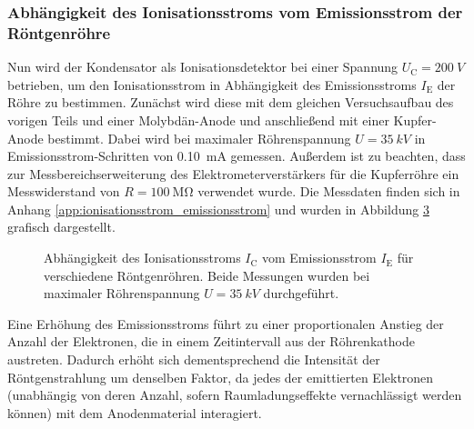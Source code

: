 \documentclass[11pt, a4paper]{article}
\numberwithin{equation}{section}
\begin{document}
\subsubsection{Abhängigkeit des Ionisationsstroms vom Emissionsstrom der Röntgenröhre}
\label{sec:abh_emissionsstrom}
Nun wird der Kondensator als Ionisationsdetektor bei einer Spannung $U_\mathrm{C} = \SI{200}{V}$ betrieben, um den Ionisationsstrom in Abhängigkeit des Emissionsstroms $I_\mathrm{E}$ der Röhre zu bestimmen.
Zunächst wird diese mit dem gleichen Versuchsaufbau des vorigen Teils und einer Molybdän-Anode und anschließend mit einer Kupfer-Anode bestimmt.
Dabei wird bei maximaler Röhrenspannung $U = \SI{35}{kV}$ in Emissionsstrom-Schritten von \SI{0.10}{mA} gemessen.
Außerdem ist zu beachten, dass zur Messbereichserweiterung des Elektrometerverstärkers für die Kupferröhre ein Messwiderstand von $R=\SI{100}{\mega\ohm}$ verwendet wurde.
Die Messdaten finden sich in Anhang \ref{app:ionisationsstrom_emissionsstrom} und wurden in Abbildung \ref{fig:abh_emissionsstrom} grafisch dargestellt.
\begin{figure}[hp]
	\begin{subfigure}[b]{1\textwidth}
		\centering
		
		\label{fig:mo_emissionsstrom}
	\end{subfigure}
	
	\vspace{10mm}
	
	\begin{subfigure}[b]{1\textwidth}
		\centering
		
		\label{fig:cu_emissionsstrom}
	\end{subfigure}
	\caption{Abhängigkeit des Ionisationsstroms $I_\mathrm{C}$ vom Emissionsstrom $I_\mathrm{E}$ für verschiedene Röntgenröhren. Beide Messungen wurden bei maximaler Röhrenspannung $U=\SI{35}{kV}$ durchgeführt.}
	\label{fig:abh_emissionsstrom}
\end{figure}
Eine Erhöhung des Emissionsstroms führt zu einer proportionalen Anstieg der Anzahl der Elektronen, die in einem Zeitintervall aus der Röhrenkathode austreten.
Dadurch erhöht sich dementsprechend die Intensität der Röntgenstrahlung um denselben Faktor, da jedes der emittierten Elektronen (unabhängig von deren Anzahl, sofern Raumladungseffekte vernachlässigt werden können) mit dem Anodenmaterial interagiert.
\end{document}
